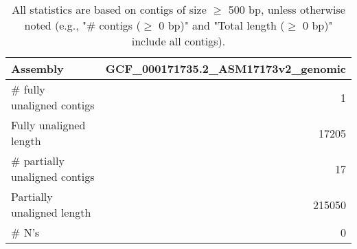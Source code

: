 \documentclass[12pt,a4paper]{article}
\begin{document}
\begin{table}[ht]
\begin{center}
\caption{All statistics are based on contigs of size $\geq$ 500 bp, unless otherwise noted (e.g., "\# contigs ($\geq$ 0 bp)" and "Total length ($\geq$ 0 bp)" include all contigs).}
\begin{tabular}{|l*{1}{|r}|}
\hline
Assembly & GCF\_000171735.2\_ASM17173v2\_genomic \\ \hline
\# fully unaligned contigs & 1 \\ \hline
Fully unaligned length & 17205 \\ \hline
\# partially unaligned contigs & 17 \\ \hline
Partially unaligned length & 215050 \\ \hline
\# N's & 0 \\ \hline
\end{tabular}
\end{center}
\end{table}
\end{document}
